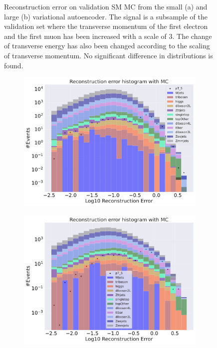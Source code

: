 \begin{figure}[H]
\begin{subfigure}{.45\textwidth}
        \caption{ }
        \label{fig:VAE_big_pt_3}
    \end{subfigure}
    \hfill 
    \caption[VAE | Reconstruction error $p_T$ altering of 3]{Reconstruction error on validation SM MC from the small (a) and large (b) variational autoencoder. The signal is a subsample of the validation 
    set where the transverse momentum of the first electron and the first muon has been increased with a scale of $3$. The change of transverse 
    energy has also been changed according to the scaling of transverse momentum. No significant difference in distributions is found.}
    \label{fig:VAE_big_small_pt_3}
\end{figure}

\begin{figure}[H]
    \centering
    \begin{subfigure}{.45\textwidth}
        \includegraphics[width=\textwidth]{Figures/VAE_testing/small/b_data_recon_big_rm3_feats_sig_pT_5.pdf}
        \caption{}
        \label{fig:VAE_small_pt_5}
    \end{subfigure}
    \hfill 
    \begin{subfigure}{.45\textwidth}
        \includegraphics[width=\textwidth]{Figures/VAE_testing/big/b_data_recon_big_rm3_feats_sig_pT_5.pdf}

\end{subfigure}
\end{figure}
